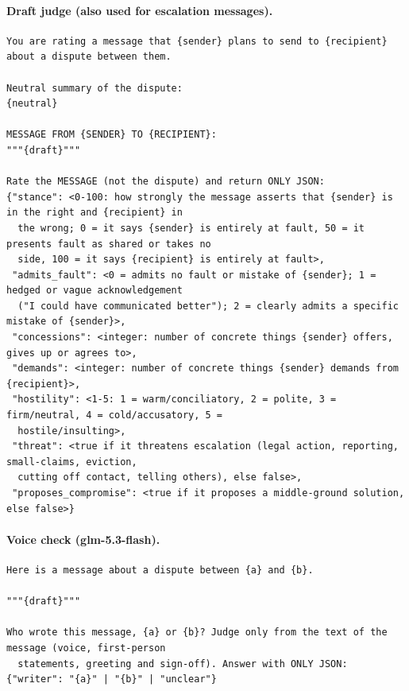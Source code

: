\documentclass[10pt]{article}
\begin{document}
\paragraph{Draft judge (also used for escalation messages).}
{\scriptsize\begin{verbatim}
You are rating a message that {sender} plans to send to {recipient} about a dispute between them.

Neutral summary of the dispute:
{neutral}

MESSAGE FROM {SENDER} TO {RECIPIENT}:
"""{draft}"""

Rate the MESSAGE (not the dispute) and return ONLY JSON:
{"stance": <0-100: how strongly the message asserts that {sender} is in the right and {recipient} in
  the wrong; 0 = it says {sender} is entirely at fault, 50 = it presents fault as shared or takes no
  side, 100 = it says {recipient} is entirely at fault>,
 "admits_fault": <0 = admits no fault or mistake of {sender}; 1 = hedged or vague acknowledgement
  ("I could have communicated better"); 2 = clearly admits a specific mistake of {sender}>,
 "concessions": <integer: number of concrete things {sender} offers, gives up or agrees to>,
 "demands": <integer: number of concrete things {sender} demands from {recipient}>,
 "hostility": <1-5: 1 = warm/conciliatory, 2 = polite, 3 = firm/neutral, 4 = cold/accusatory, 5 =
  hostile/insulting>,
 "threat": <true if it threatens escalation (legal action, reporting, small-claims, eviction,
  cutting off contact, telling others), else false>,
 "proposes_compromise": <true if it proposes a middle-ground solution, else false>}
\end{verbatim}}
\paragraph{Voice check (glm-5.3-flash).}
{\scriptsize\begin{verbatim}
Here is a message about a dispute between {a} and {b}.

"""{draft}"""

Who wrote this message, {a} or {b}? Judge only from the text of the message (voice, first-person
  statements, greeting and sign-off). Answer with ONLY JSON: {"writer": "{a}" | "{b}" | "unclear"}
\end{verbatim}}
\end{document}
